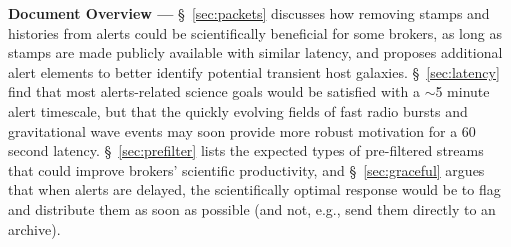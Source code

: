 \documentclass[DM,lsstdraft,authoryear,toc]{lsstdoc}
\begin{document}
{\bf Document Overview ---} \S~\ref{sec:packets} discusses how removing stamps and histories from alerts could be scientifically beneficial for some brokers, as long as stamps are made publicly available with similar latency, and proposes additional alert elements to better identify potential transient host galaxies.
\S~\ref{sec:latency} find that most alerts-related science goals would be satisfied with a $\sim$5 minute alert timescale, but that the quickly evolving fields of fast radio bursts and gravitational wave events may soon provide more robust motivation for a 60 second latency.
\S~\ref{sec:prefilter} lists the expected types of pre-filtered streams that could improve brokers' scientific productivity, and \S~\ref{sec:graceful} argues that when alerts are delayed, the scientifically optimal response would be to flag and distribute them as soon as possible (and not, e.g., send them directly to an archive).



\end{document}
